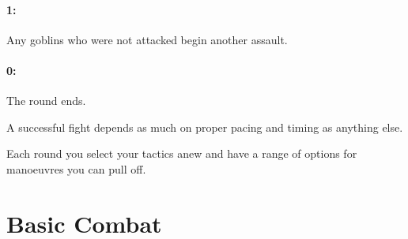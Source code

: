 \begin{multicols}{2}
\paragraph{1:} Any goblins who were not attacked begin another assault.
\paragraph{0:} The round ends.

\vspace{1em}

A successful fight depends as much on proper pacing and timing as anything else.

Each \gls{round} you select your tactics anew and have a range of options for manoeuvres you can pull off.

\end{multicols}

\section{Basic Combat}

